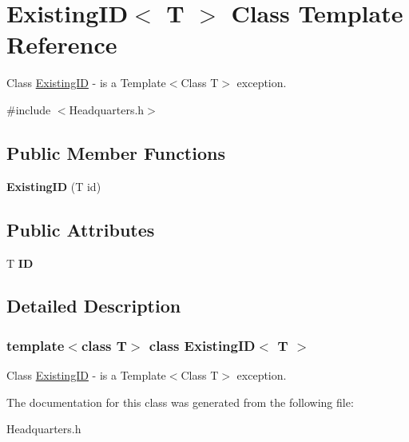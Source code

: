 \hypertarget{class_existing_i_d}{}\section{Existing\+ID$<$ T $>$ Class Template Reference}
\label{class_existing_i_d}


Class \hyperlink{class_existing_i_d}{Existing\+ID} -\/ is a Template$<$\+Class T$>$ exception.  




{\ttfamily \#include $<$Headquarters.\+h$>$}

\subsection*{Public Member Functions}
\begin{DoxyCompactItemize}
\item 
\mbox{\label{class_existing_i_d_a41a86a01eb31c91bec02239cdf7f40f9}} 
{\bfseries Existing\+ID} (T id)
\end{DoxyCompactItemize}
\subsection*{Public Attributes}
\begin{DoxyCompactItemize}
\item 
\mbox{\label{class_existing_i_d_aabb0b3d64f2384c507e13ec357f32365}} 
T {\bfseries ID}
\end{DoxyCompactItemize}


\subsection{Detailed Description}
\subsubsection*{template$<$class T$>$\newline
class Existing\+I\+D$<$ T $>$}

Class \hyperlink{class_existing_i_d}{Existing\+ID} -\/ is a Template$<$\+Class T$>$ exception. 

The documentation for this class was generated from the following file\+:\begin{DoxyCompactItemize}
\item 
Headquarters.\+h\end{DoxyCompactItemize}
